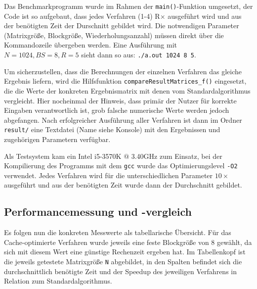 \documentclass[a4paper,11pt]{scrartcl}
\begin{document}
Das Benchmarkprogramm wurde im Rahmen der \texttt{main()}-Funktion umgesetzt,
der Code ist so aufgebaut, dass jedes Verfahren (1-4) R$\times$ ausgeführt wird
und aus der benötigten Zeit der Durschnitt gebildet wird. Die notwendigen Parameter
(Matrixgröße, Blockgröße, Wiederholungsanzahl) müssen direkt über die Kommandozeile übergeben werden.
Eine Ausführung mit $N = 1024, BS = 8, R = 5$ sieht dann so aus: \texttt{./a.out 1024 8 5}.
\newline

Um sicherzustellen, dass die Berechnungen der einzelnen Verfahren das gleiche Ergebnis
liefern, wird die Hilfsfunktion \texttt{compareResultMatrices\_f()} eingesetzt, die
die Werte der konkreten Ergebnismatrix mit denen vom Standardalgorithmus vergleicht.
Hier nocheinmal der Hinweis, dass primär der Nutzer für korrekte Eingaben verantwortlich ist, 
grob falsche numerische Werte werden jedoch abgefangen.
Nach erfolgreicher Ausführung aller Verfahren ist dann im Ordner \texttt{result/} eine Textdatei (Name
siehe Konsole) mit den Ergebnissen und zugehörigen Parametern verfügbar. \newline

Als Testsystem kam ein Intel i5-3570K $@$ 3.40GHz zum Einsatz, bei der
Kompilierung des Programms mit dem \texttt{gcc} wurde das Optimierungslevel \texttt{-O2} verwendet.
Jedes Verfahren wird für die unterschiedlichen
Parameter $10 \times$ ausgeführt und aus der benötigten Zeit wurde dann der
Durchschnitt gebildet.


\subsection{Performancemessung und -vergleich}
Es folgen nun die konkreten Messwerte als tabellarische Übersicht.
Für das Cache-optimierte Verfahren wurde jeweils eine feste Blockgröße von $8$ gewählt,
da sich mit diesem Wert eine günstige Rechenzeit ergeben hat.
Im Tabellenkopf ist die jeweils getestete Matrixgröße \texttt{N} abgebildet, in den Spalten
befindet sich die durchschnittlich benötigte Zeit und der Speedup des jeweiligen
Verfahrens in Relation zum Standardalgorithmus.\newline

\end{document}
